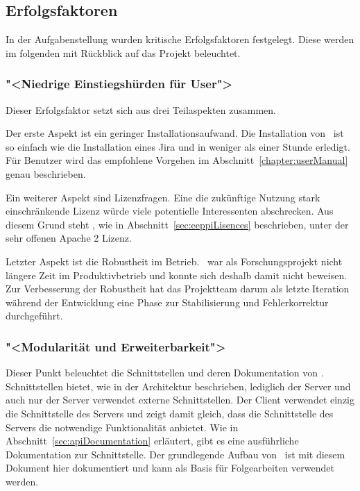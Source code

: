 	\subsection{Erfolgsfaktoren}
		In der Aufgabenstellung wurden kritische Erfolgsfaktoren festgelegt.
		Diese werden im folgenden mit Rückblick auf das Projekt beleuchtet.
		
		
		\subsubsection{"<Niedrige Einstiegshürden für User">}
			Dieser Erfolgsfaktor setzt sich aus drei Teilaspekten zusammen.
			
			Der erste Aspekt ist ein geringer Installationsaufwand.
			Die Installation von \eeppi\ ist so einfach wie  die Installation eines Jira und in weniger als einer Stunde erledigt. 
			Für Benutzer wird das empfohlene Vorgehen im Abschnitt~\ref{chapter:userManual} genau beschrieben.
			
			Ein weiterer Aspekt sind Lizenzfragen.
			Eine die zukünftige Nutzung stark einschränkende Lizenz würde viele potentielle Interessenten abschrecken.
			Aus diesem Grund steht \eeppi, wie in Abschnitt~\ref{sec:eeppiLisences} beschrieben, unter der sehr offenen Apache 2 Lizenz.
			
			Letzter Aspekt ist die Robustheit im Betrieb.
			\eeppi\ war als Forschungsprojekt nicht längere Zeit im Produktivbetrieb
			und konnte sich deshalb damit nicht beweisen.
			Zur Verbesserung der Robustheit hat das Projektteam darum als letzte Iteration während der Entwicklung eine Phase zur Stabilisierung und Fehlerkorrektur durchgeführt.
		
		
		\subsubsection{"<Modularität und Erweiterbarkeit">}
			Dieser Punkt beleuchtet die Schnittstellen und deren Dokumentation von \eeppi.
			Schnittstellen bietet, wie in der Architektur beschrieben, lediglich der Server
			und auch nur der Server verwendet externe Schnittstellen.
			Der Client verwendet einzig die Schnittstelle des Servers
			und zeigt damit gleich, dass die Schnittstelle des Servers die notwendige Funktionalität anbietet.
			Wie in Abschnitt~\ref{sec:apiDocumentation} erläutert, gibt es eine ausführliche Dokumentation zur Schnittstelle.
			Der grundlegende Aufbau von \eeppi\ ist mit diesem Dokument hier dokumentiert
			und kann als Basis für Folgearbeiten verwendet werden.
			
